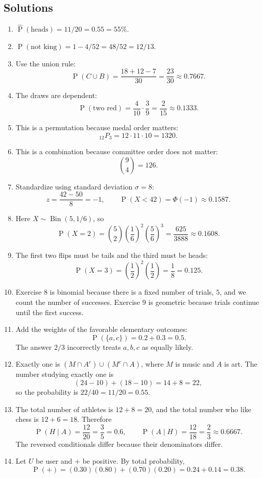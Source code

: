 \documentclass[11pt]{article}
\newcommand{\Pp}{\operatorname{P}}
\newcommand{\Bin}{\operatorname{Bin}}
\begin{document}
\subsection*{Solutions}
\begin{enumerate}
\item $\widehat{\Pp}(\text{heads})=11/20=0.55=55\%$.
\item $\Pp(\text{not king})=1-4/52=48/52=12/13$.
\item Use the union rule:
\[
\Pp(C\cup B)=\frac{18+12-7}{30}=\frac{23}{30}\approx0.7667.
\]
\item The draws are dependent:
\[
\Pp(\text{two red})=\frac{4}{10}\cdot\frac{3}{9}=\frac{2}{15}\approx0.1333.
\]
\item This is a permutation because medal order matters:
\[
{}_{12}P_3=12\cdot11\cdot10=1320.
\]
\item This is a combination because committee order does not matter:
\[
\binom{9}{4}=126.
\]
\item Standardize using standard deviation $\sigma=8$:
\[
z=\frac{42-50}{8}=-1,
\qquad \Pp(X<42)=\Phi(-1)\approx0.1587.
\]
\item Here $X\sim\Bin(5,1/6)$, so
\[
\Pp(X=2)=\binom52\left(\frac16\right)^2\left(\frac56\right)^3
=\frac{625}{3888}\approx0.1608.
\]
\item The first two flips must be tails and the third must be heads:
\[
\Pp(X=3)=\left(\frac12\right)^2\left(\frac12\right)=\frac18=0.125.
\]
\item Exercise 8 is binomial because there is a fixed number of trials, $5$, and
we count the number of successes.  Exercise 9 is geometric because trials
continue until the first success.
\item Add the weights of the favorable elementary outcomes:
\[
\Pp(\{a,c\})=0.2+0.3=0.5.
\]
The answer $2/3$ incorrectly treats $a,b,c$ as equally likely.
\item Exactly one is $(M\cap A^c)\cup(M^c\cap A)$, where $M$ is music and $A$ is
art.  The number studying exactly one is
\[
(24-10)+(18-10)=14+8=22,
\]
so the probability is $22/40=11/20=0.55$.
\item The total number of athletes is $12+8=20$, and the total number who like
chess is $12+6=18$.  Therefore
\[
\Pp(H\mid A)=\frac{12}{20}=\frac35=0.6,
\qquad
\Pp(A\mid H)=\frac{12}{18}=\frac23\approx0.6667.
\]
The reversed conditionals differ because their denominators differ.
\item Let $U$ be user and $+$ be positive.  By total probability,
\[
\Pp(+)=(0.30)(0.80)+(0.70)(0.20)=0.24+0.14=0.38.
\]
\end{enumerate}
\end{document}
